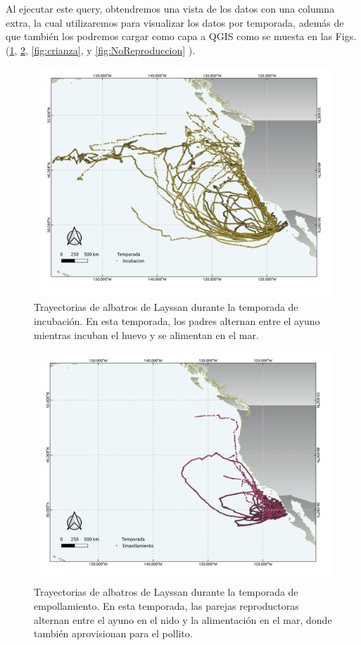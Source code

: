 Al ejecutar este query, obtendremos una vista de los datos con una columna
extra, la cual utilizaremos para visualizar los datos por temporada, además de
que también los podremos cargar como capa a QGIS como se muesta en las Figs.
(\ref{fig:incubacion}, \ref{fig:empollamiento}, \ref{fig:crianza}, y
\ref{fig:NoReproduccion}
).

\begin{figure}[h]
    \centering
    \includegraphics[scale=0.6]{figures/seasonsIncubacion.png}
    \caption{Trayectorias de albatros de Layssan durante la temporada de
    incubación. En esta temporada, los padres alternan entre el ayuno mientras
    incuban el huevo y se alimentan en el mar.}
    \label{fig:incubacion}
\end{figure}


\begin{figure}[h]
    \centering
    \includegraphics[scale=0.60]{figures/seasonsEmpollamiento.png}
    \caption{Trayectorias de albatros de Layssan durante la temporada de
    empollamiento. En esta temporada, las parejas reproductoras alternan entre
    el ayuno en el nido y la alimentación en el mar, donde también aprovisionan
    para el pollito.}
    \label{fig:empollamiento}
\end{figure}

